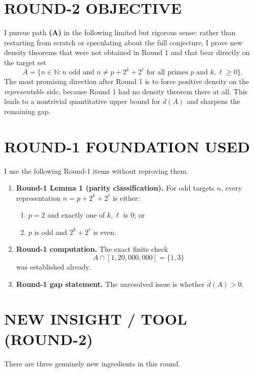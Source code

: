 \section{ROUND-2 OBJECTIVE}

I pursue path \textbf{(A)} in the following limited but rigorous sense: rather than restarting from scratch or speculating about the full conjecture, I prove new density theorems that were not obtained in Round 1 and that bear directly on the target set
\[
A=\{n\in\mathbb N: n\text{ odd and } n\neq p+2^k+2^\ell\text{ for all primes }p\text{ and }k,\ell\ge 0\}.
\]
The most promising direction after Round 1 is to force positive density on the \emph{representable} side, because Round 1 had no density theorem there at all. This leads to a nontrivial quantitative upper bound for $\overline d(A)$ and sharpens the remaining gap.

\section{ROUND-1 FOUNDATION USED}

I use the following Round-1 items without reproving them.

\begin{enumerate}
\item \textbf{Round-1 Lemma 1 (parity classification).} For odd targets $n$, every representation $n=p+2^k+2^\ell$ is either:
\begin{enumerate}
\item $p=2$ and exactly one of $k,\ell$ is $0$; or
\item $p$ is odd and $2^k+2^\ell$ is even.
\end{enumerate}
\item \textbf{Round-1 computation.} The exact finite check
\[
A\cap[1,20{,}000{,}000]=\{1,3\}
\]
was established already.
\item \textbf{Round-1 gap statement.} The unresolved issue is whether $\overline d(A)>0$.
\end{enumerate}

\section{NEW INSIGHT / TOOL (ROUND-2)}

There are three genuinely new ingredients in this round.

